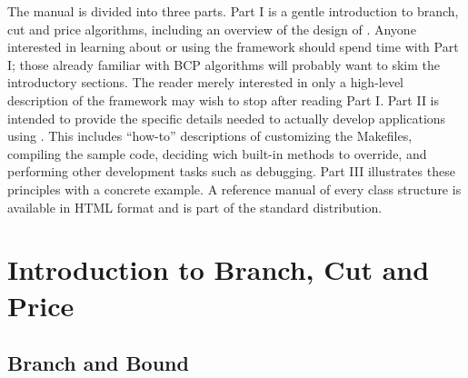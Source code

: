 The manual is divided into three parts. Part I is a gentle
introduction to branch, cut and price algorithms, including an
overview of the design of \BB. Anyone interested in learning
about or using the framework should spend time with Part I;
those already familiar with BCP algorithms will probably want to skim
the introductory sections. The reader merely
interested in only a high-level description of the framework may wish to
stop after reading Part I. Part II
is intended to provide the specific details needed
to actually develop applications using \BB. This includes ``how-to''
descriptions of customizing the Makefiles, compiling the sample code, deciding
wich built-in methods to override, 
and performing other development tasks such as
debugging. Part III illustrates these principles with a concrete
example. A reference manual of every class structure is available in
HTML format and is part of the standard distribution.

\section{Introduction to Branch, Cut and Price}
\label{B&C-intro}

\subsection{Branch and Bound}


